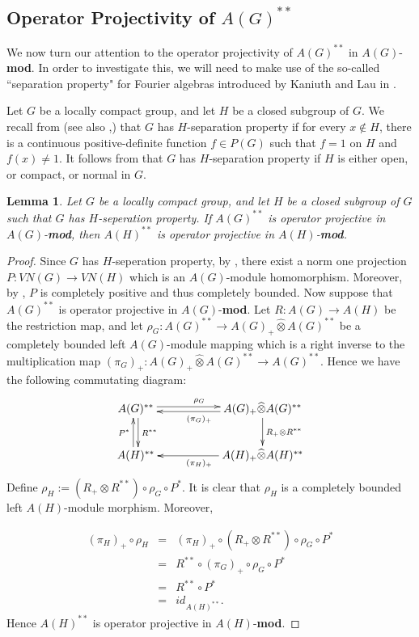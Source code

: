 \documentclass[10pt]{amsart}
\newtheorem{lem}[thm]{Lemma}
\numberwithin{thm}{section}
\numberwithin{equation}{section}
\begin{document}
\subsection{Operator Projectivity of $A(G)^{**}$}

We now turn our attention to the operator projectivity of $A(G)^{**}$ in $A(G)$-{\textbf{mod}}. 
In order to investigate this, we will need to make use of the so-called ``separation property" for Fourier algebras introduced 
by Kaniuth and Lau in \cite{KL}.
 
Let $G$ be a locally compact group, and let $H$ be a closed subgroup of $G$. We recall from \cite{KL} (see also
\cite{Der},\cite{DD}) that
$G$ has $H$-separation property if for every $x \notin H$, there is a continuous positive-definite function 
$f\in P(G)$ such that $f=1$ on $H$ and $f(x)\neq 1$. It follows from \cite{LL} that $G$ has $H$-separation
property if $H$ is either open, or compact, or normal in $G$.

\begin{lem}\label{L:sep property}
Let $G$ be a locally compact group, and let $H$ be a closed subgroup of $G$ such that
$G$ has $H$-seperation property. If $A(G)^{**}$ is operator projective in $A(G)$-{\textbf{mod}}, then
$A(H)^{**}$ is operator projective in $A(H)$-{\textbf{mod}}.
\end{lem}

\begin{proof}
Since $G$ has $H$-seperation property, by \cite[Proposition 3.1]{KL}, there exist a norm one 
projection $P : VN(G) \to VN(H)$ which is an $A(G)$-module homomorphism. Moreover, by 
\cite[Theorem 5.1.5]{Li}, $P$ is completely positive and thus completely bounded. Now suppose 
that $A(G)^{**}$ is operator projective in $A(G)$-{\textbf{mod}}. Let $R : A(G) \to A(H)$
be the restriction map, and let $\rho_G : A(G)^{**} \to A(G)_+ \widehat{\otimes} 
A(G)^{**}$ be a completely bounded left $A(G)$-module mapping which is a right inverse to the multiplication map 
$(\pi_G)_+ : A(G)_+ \widehat{\otimes} A(G)^{**} \to A(G)^{**}$. Hence we have the following commutating diagram:
\[
\xymatrix{
A(G)^{**} \ar@<.5ex>[rr]^{\rho_G} \ar@<.5ex>[d]^{R^{**}}
& & A(G)_+ \widehat{\otimes} A(G)^{**} \ar[d]^{R_+ \otimes R^{**}} \ar@<.5ex>[ll]^{(\pi_G)_+}  \\
A(H)^{**} \ar@<.5ex>[u]^{P^*}
& & A(H)_+ \widehat{\otimes} A(H)^{**} 
\ar[ll]^{(\pi_H)_+}  }
\]
Define $\rho_H:=(R_+ \otimes R^{**})\circ \rho_G \circ P^*$. It is clear that $\rho_H$
is a completely bounded left $A(H)$-module morphism. Moreover,

\begin{eqnarray*} 
(\pi_H)_+\circ \rho_H  &=& (\pi_H)_+ \circ (R_+ \otimes R^{**})\circ \rho_G \circ P^* \\ 
& =& R^{**}\circ (\pi_G)_+ \circ \rho_G \circ P^*  \\ 
&= & R^{**}\circ  P^* \\ 
&=& id_{A(H)^{**}}.
\end{eqnarray*}
Hence $A(H)^{**}$ is operator projective in $A(H)$-{\textbf{mod}}.
 
\end{proof}
\end{document}
